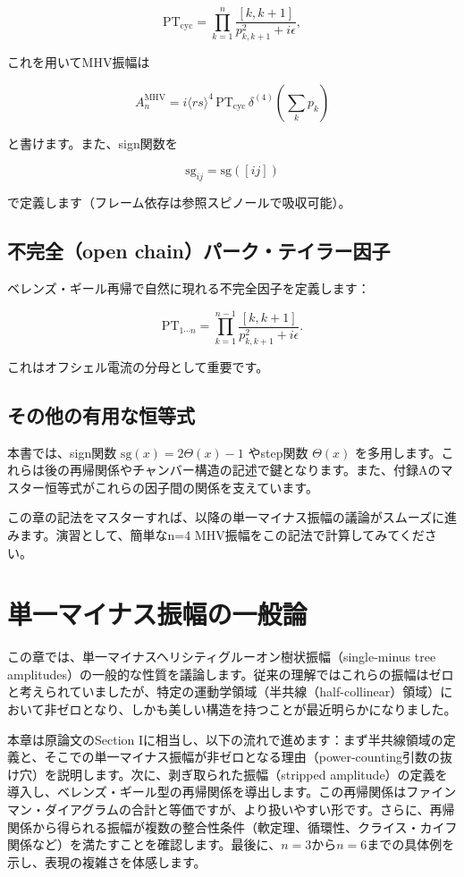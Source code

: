 \documentclass[dvipdfmx,a4paper]{jsbook}
\theoremstyle{definition}
\theoremstyle{remark}
\begin{document}
\[
\text{PT}_{\text{cyc}} = \prod_{k=1}^n \frac{[k, k+1]}{p_{k,k+1}^2 + i\epsilon},
\]

これを用いてMHV振幅は

\[
A_n^{\text{MHV}} = i \langle rs \rangle^4 \, \text{PT}_{\text{cyc}} \, \delta^{(4)}\left( \sum_k p_k \right)
\]

と書けます。また、sign関数を

\[
\text{sg}_{ij} = \text{sg}([ij])
\]

で定義します（フレーム依存は参照スピノールで吸収可能）。

\section{不完全（open chain）パーク・テイラー因子}

ベレンズ・ギール再帰で自然に現れる不完全因子を定義します：

\[
\text{PT}_{1 \cdots n} = \prod_{k=1}^{n-1} \frac{[k, k+1]}{p_{k,k+1}^2 + i\epsilon}.
\]

これはオフシェル電流の分母として重要です。

\section{その他の有用な恒等式}

本書では、sign関数 \(\text{sg}(x) = 2\Theta(x) - 1\) やstep関数 \(\Theta(x)\) を多用します。これらは後の再帰関係やチャンバー構造の記述で鍵となります。また、付録Aのマスター恒等式がこれらの因子間の関係を支えています。

この章の記法をマスターすれば、以降の単一マイナス振幅の議論がスムーズに進みます。演習として、簡単なn=4 MHV振幅をこの記法で計算してみてください。

\chapter{単一マイナス振幅の一般論}

この章では、単一マイナスヘリシティグルーオン樹状振幅（single-minus tree amplitudes）の一般的な性質を議論します。従来の理解ではこれらの振幅はゼロと考えられていましたが、特定の運動学領域（半共線（half-collinear）領域）において非ゼロとなり、しかも美しい構造を持つことが最近明らかになりました。

本章は原論文のSection Iに相当し、以下の流れで進めます：まず半共線領域の定義と、そこでの単一マイナス振幅が非ゼロとなる理由（power-counting引数の抜け穴）を説明します。次に、剥ぎ取られた振幅（stripped amplitude）の定義を導入し、ベレンズ・ギール型の再帰関係を導出します。この再帰関係はファインマン・ダイアグラムの合計と等価ですが、より扱いやすい形です。さらに、再帰関係から得られる振幅が複数の整合性条件（軟定理、循環性、クライス・カイフ関係など）を満たすことを確認します。最後に、$n=3$から$n=6$までの具体例を示し、表現の複雑さを体感します。
\end{document}
